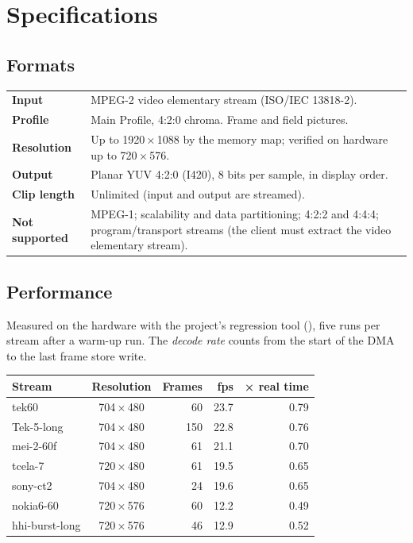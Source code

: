 \chapter{Specifications}

\section{Formats}

\begin{center}
\begin{tabularx}{\linewidth}{@{}l X@{}}
\toprule
\textbf{Input} & MPEG-2 video elementary stream (ISO/IEC 13818-2). \\
\textbf{Profile} & Main Profile, 4:2:0 chroma. Frame and field pictures. \\
\textbf{Resolution} & Up to 1920\,×\,1088 by the memory map; verified on
  hardware up to 720\,×\,576. \\
\textbf{Output} & Planar YUV 4:2:0 (I420), 8 bits per sample, in display
  order. \\
\textbf{Clip length} & Unlimited (input and output are streamed). \\
\midrule
\textbf{Not supported} & MPEG-1; scalability and data partitioning; 4:2:2
  and 4:4:4; program/transport streams (the client must extract the video
  elementary stream). \\
\bottomrule
\end{tabularx}
\end{center}

\section{Performance}

Measured on the hardware with the project's regression tool
(), five runs per stream after a warm-up run. The
\emph{decode rate} counts from the start of the DMA to the last frame store
write.

\begin{center}
\begin{tabular}{@{}l c r r r@{}}
\toprule
\textbf{Stream} & \textbf{Resolution} & \textbf{Frames} & \textbf{fps} & \textbf{× real time} \\
\midrule
tek60          & 704\,×\,480 &  60 & 23.7 & 0.79 \\
Tek-5-long     & 704\,×\,480 & 150 & 22.8 & 0.76 \\
mei-2-60f      & 704\,×\,480 &  61 & 21.1 & 0.70 \\
tcela-7        & 720\,×\,480 &  61 & 19.5 & 0.65 \\
sony-ct2       & 704\,×\,480 &  24 & 19.6 & 0.65 \\
nokia6-60      & 720\,×\,576 &  60 & 12.2 & 0.49 \\
hhi-burst-long & 720\,×\,576 &  46 & 12.9 & 0.52 \\
\bottomrule
\end{tabular}
\end{center}


